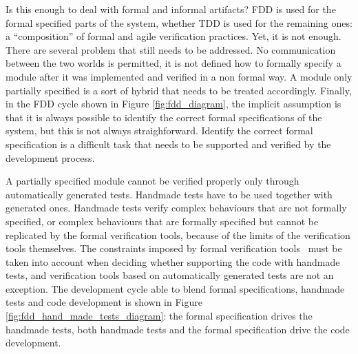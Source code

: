 \documentclass[english]{lni}
\begin{document}
Is this enough to deal with formal and informal artifacts?
FDD is used for the formal specified parts of the system, whether TDD is used for the remaining ones: a ``composition'' of formal and agile verification practices.
Yet, it is not enough.
There are several problem that still needs to be addressed.
No communication between the two worlds is permitted, it is not defined how to formally specify a module after it was implemented and verified in a non formal way.
A module only partially specified is a sort of hybrid that needs to be treated accordingly.
Finally, in the FDD cycle shown in Figure \ref{fig:fdd_diagram}, the implicit assumption is that it is always possible to identify the correct formal specifications of the system, but this is not always straighforward.
Identify the correct formal specification is a difficult task that needs to be supported and verified by the development process.

A partially specified module cannot be verified properly only through automatically generated tests.
Handmade tests have to be used together with generated ones.
Handmade tests verify complex behaviours that are not formally specified, or complex behaviours that are formally specified but cannot be replicated by the formal verification tools, because of the limits of the verification tools themselves. 
The constraints imposed by formal verification tools~\cite{Glass2002} must be taken into account when deciding whether supporting the code with handmade tests, and verification tools based on automatically generated tests are not an exception.
The development cycle able to blend formal specifications, handmade tests and code development is shown in Figure \ref{fig:fdd_hand_made_tests_diagram}: the formal specification drives the handmade tests, both handmade tests and the formal specification drive the code development.
\end{document}
